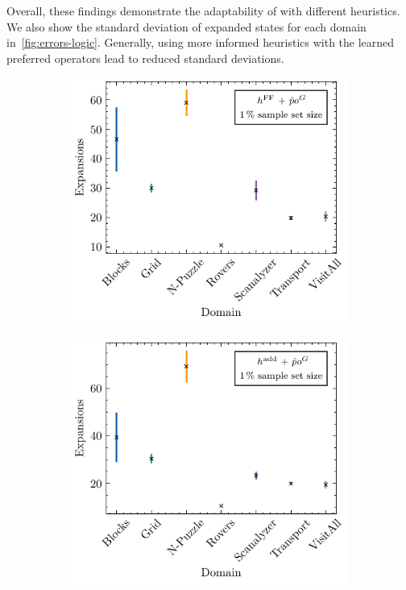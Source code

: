 \documentclass[ppgc,diss,english]{iiufrgs}
\begin{document}
Overall, these findings demonstrate the adaptability of \pog with different heuristics. We also show the standard deviation of expanded states for each domain in~\cref{fig:errors-logic}. Generally, using more informed heuristics with the learned preferred operators lead to reduced standard deviations.

\begin{figure}[tb]
  \caption[Standard deviation of expansions using logic heuristics with \pog]{Mean number of expansions and its standard deviation per domain for DQ-GBFS guided by different logic-based heuristics and \pog.}
  \centering
  \vspace{\baselineskip}
  \begin{subfigure}{0.41\textwidth}
    \centering
    \includegraphics[width=\linewidth]{img/error_hFF_poG_1pct.pdf}
  \end{subfigure}
  \begin{subfigure}{0.41\textwidth}
    \centering
    \includegraphics[width=\linewidth]{img/error_hADD_poG_1pct.pdf}
  \end{subfigure}


\end{figure}
\end{document}
